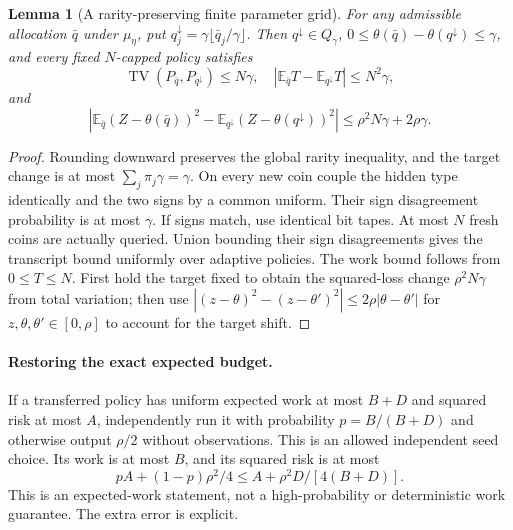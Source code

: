 \documentclass[11pt]{article}
\newtheorem{lemma}{Lemma}
\newcommand{\E}{\mathbb E}
\newcommand{\TV}{\operatorname{TV}}
\begin{document}
\begin{lemma}[A rarity-preserving finite parameter grid]
For any admissible allocation $\bar q$ under $\mu_\eta$, put
$q_j^\downarrow=\gamma\lfloor\bar q_j/\gamma\rfloor$. Then
$q^\downarrow\in Q_\gamma$,
$0\le\theta(\bar q)-\theta(q^\downarrow)\le\gamma$, and every fixed
$N$-capped policy satisfies
\[
 \TV(P_{\bar q},P_{q^\downarrow})\le N\gamma,
 \quad |\E_{\bar q}T-\E_{q^\downarrow}T|\le N^2\gamma,
\]
and
\[
 |\E_{\bar q}(Z-\theta(\bar q))^2
       -\E_{q^\downarrow}(Z-\theta(q^\downarrow))^2|
       \le\rho^2N\gamma+2\rho\gamma.
\]
\end{lemma}
\begin{proof}
Rounding downward preserves the global rarity inequality, and the target
change is at most $\sum_j\pi_j\gamma=\gamma$. On every new coin couple the
hidden type identically and the two signs by a common uniform. Their sign
disagreement probability is at most $\gamma$. If signs match, use identical
bit tapes. At most $N$ fresh coins are actually queried. Union bounding their
sign disagreements gives the transcript bound uniformly over adaptive
policies. The work bound follows from $0\le T\le N$. First hold the target
fixed to obtain the squared-loss change $\rho^2N\gamma$ from total variation;
then use $|(z-\theta)^2-(z-\theta')^2|\le2\rho|\theta-\theta'|$ for
$z,\theta,\theta'\in[0,\rho]$ to account for the target shift.
\end{proof}

\paragraph{Restoring the exact expected budget.}
If a transferred policy has uniform expected work at most $B+D$ and squared
risk at most $A$, independently run it with probability $p=B/(B+D)$ and
otherwise output $\rho/2$ without observations. This is an allowed independent
seed choice. Its work is at most $B$, and its squared risk is at most
\[
 pA+(1-p)\rho^2/4\le A+\rho^2D/[4(B+D)].                 \tag{2}
\]
This is an expected-work statement, not a high-probability or deterministic
work guarantee. The extra error is explicit.
\end{document}
